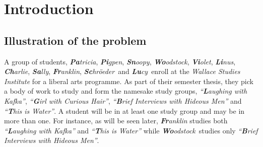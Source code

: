 \documentclass[MS,]{iitmdiss}
\title{\mythesistitle}
\author{\myname}
\date{\MakeUppercase
  {\mysubmissionmonth}}
\begin{document}
\nocite{*}
\maketitle

\begin{singlespace}
\tableofcontents
\thispagestyle{empty}
\end{singlespace}

\setcounter{page}{0}


\chapter{Introduction}
\label{chap:intro}


\section{Illustration of the problem}
\label{sec:problem}

\def \LLL {{\em ``{\bf L}aughing with Kafka''}} %
\def \GGG {{\em ``{\bf G}irl with Curious Hair''}} %
\def \BBB {{\em ``{\bf B}rief Interviews with Hideous Men''}} %
\def \TTT {{\em ``{\bf T}his is Water''}} %

\def \Pa {{\em {\bf Pa}tricia}} 
\def \Pi {{\em {\bf Pi}gpen}} %
\def \Sn {{\em {\bf Sn}oopy}}
\def \Wo {{\em {\bf Wo}odstock}}
\def \Vi {{\em {\bf Vi}olet}} 
\def \Li {{\em {\bf Li}nus}} 
\def \Ch {{\em {\bf Ch}arlie}}
\def \Sa {{\em {\bf Sa}lly}}
\def \Fr {{\em {\bf Fr}anklin}}  %
\def \Sc {{\em {\bf Sc}hr{\"o}eder}} 
\def \Lu {{\em {\bf Lu}cy}}

\def \residenceblock {{\em Infinite Loop}}

\def \WSI {{\em Wallace Studies Institute}}

A group of students, \Pa, \Pi, \Sn, \Wo, \Vi, \Li, \Ch, \Sa, \Fr,
  \Sc\ and \Lu\ enroll at the
{\WSI} for a liberal arts programme.  As part
of their semester thesis, they pick a body of work to study and form
the namesake study groups, {\LLL}, {\GGG}, {\BBB} and {\TTT}. A student
will be in at least one study group and may be in more than one. For
instance, as will be seen later, {\Fr} studies both {\LLL} and {\TTT}
while \Wo\ studies only \BBB.
\end{document}
